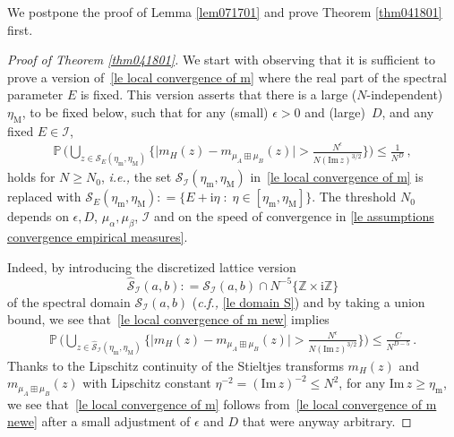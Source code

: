 \documentclass[10pt,reqno]{amsart}
\numberwithin{equation}{section}
\theoremstyle{plain}
\numberwithin{kevin}{section}
\theoremstyle{remark}
\newcommand{\im}{\mathrm{Im}\,}
\newcommand{\Z}{{\mathbb Z}}
\newcommand{\ii}{\mathrm{i}}
\newcommand{\deq}{\mathrel{\mathop:}=}
\newcommand{\ie}{\emph{i.e., }}
\newcommand{\cf}{\emph{c.f., }}
\begin{document}
We postpone the proof of Lemma \ref{lem071701} and prove Theorem \ref{thm041801} first.

\begin{proof}[Proof of Theorem \ref{thm041801}]  
We start with observing that it is sufficient to prove a version of~\eqref{le local convergence of m}
where the real part of the spectral parameter 
$E$  is fixed.
This version asserts that there is a 
 large ($N$-independent)~$\eta_{\mathrm{M}}$, to be fixed below, such that for any (small) $\epsilon>0$ and (large)~$D$,
 and  any fixed $E\in \mathcal{I}$,
\begin{align}\label{le local convergence of m new}
\mathbb{P}\,\bigg(\bigcup_{z\in\mathcal{S}_{E}(\eta_\mathrm{m},\eta_{\mathrm{M}})}\bigg\{\big|m_H(z)-m_{\mu_A\boxplus \mu_B}(z)\big|> \frac{N^{\epsilon}}{N (\im z)^{3/2}}\bigg\}\bigg)\le \frac{1}{N^D}\,,
\end{align}
holds for $N\ge N_0$, \ie the set $\mathcal{S}_{\mathcal{I}}(\eta_\mathrm{m},\eta_{\mathrm{M}})$ 
in~\eqref{le local convergence of m}
is replaced with $\mathcal{S}_{E}(\eta_\mathrm{m},\eta_{\mathrm{M}})\deq\{ E+\ii \eta \; : \; \eta\in[\eta_{\mathrm{m}},\eta_{\mathrm{M}} ]\}$. The threshold $N_0$ depends on $\epsilon, D$, $\mu_{\alpha}, \mu_\beta$, $\mathcal{I}$
and on the speed of convergence in \eqref{le assumptions convergence empirical measures}. 

Indeed, by introducing the discretized lattice version
$$
    \widehat{\mathcal{S}}_{\mathcal{I}}(a,b): =  {\mathcal{S}}_{\mathcal{I}}(a,b)\cap N^{-5}\{\Z\times \ii \Z\}
$$
of the spectral domain ${\mathcal{S}}_{\mathcal{I}}(a,b)$ (\cf \eqref{le domain S}) and by taking a union
bound, we see that~\eqref{le local convergence of m new}
implies  
\begin{align}\label{le local convergence of m newe}
\mathbb{P}\,\bigg(\bigcup_{z\in\widehat{\mathcal{S}}_{\mathcal{I}}(\eta_\mathrm{m},\eta_{\mathrm{M}})}\bigg\{\big|m_H(z)-m_{\mu_A\boxplus \mu_B}(z)\big|> \frac{N^{\epsilon}}{N (\im z)^{3/2}}\bigg\}\bigg)\le \frac{C}{N^{D-5}}\,.
\end{align}
Thanks to the Lipschitz continuity of the Stieltjes transforms $m_H(z)$ and $m_{\mu_A\boxplus \mu_B}(z)$
  with Lipschitz constant $\eta^{-2}=(\im z)^{-2}\le N^2$, for any $\im z\ge \eta_{\mathrm{m}}$, we see that~\eqref{le local convergence of m} follows from~\eqref{le local convergence of m newe} 
after a small adjustment of $\epsilon$ and $D$ that were anyway arbitrary.





\end{proof}
\end{document}
